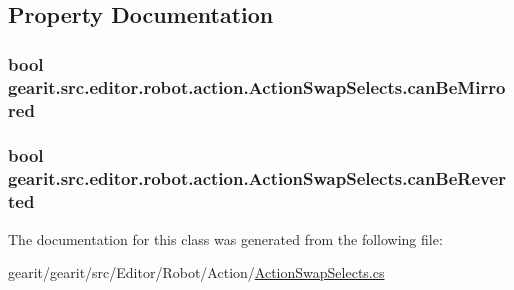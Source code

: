 \subsection{Property Documentation}
\hypertarget{classgearit_1_1src_1_1editor_1_1robot_1_1action_1_1_action_swap_selects_ac62ecd4168fc9843d1bd3ca036115dcb}{
\subsubsection[{can\+Be\+Mirrored}]{\setlength{\rightskip}{0pt plus 5cm}bool gearit.\+src.\+editor.\+robot.\+action.\+Action\+Swap\+Selects.\+can\+Be\+Mirrored\hspace{0.3cm}{\ttfamily [get]}}}\label{classgearit_1_1src_1_1editor_1_1robot_1_1action_1_1_action_swap_selects_ac62ecd4168fc9843d1bd3ca036115dcb}
\hypertarget{classgearit_1_1src_1_1editor_1_1robot_1_1action_1_1_action_swap_selects_a3e1fcc1e5a5cbd66a6a7663b73184b98}{
\subsubsection[{can\+Be\+Reverted}]{\setlength{\rightskip}{0pt plus 5cm}bool gearit.\+src.\+editor.\+robot.\+action.\+Action\+Swap\+Selects.\+can\+Be\+Reverted\hspace{0.3cm}{\ttfamily [get]}}}\label{classgearit_1_1src_1_1editor_1_1robot_1_1action_1_1_action_swap_selects_a3e1fcc1e5a5cbd66a6a7663b73184b98}


The documentation for this class was generated from the following file\+:\begin{DoxyCompactItemize}
\item 
gearit/gearit/src/\+Editor/\+Robot/\+Action/\hyperlink{_action_swap_selects_8cs}{Action\+Swap\+Selects.\+cs}\end{DoxyCompactItemize}
